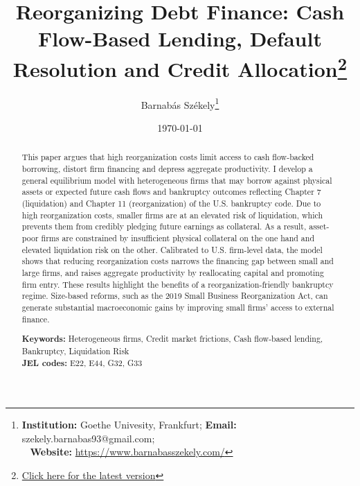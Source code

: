\documentclass[12pt]{article}
\title{\Large{\textbf{Reorganizing Debt Finance: Cash Flow-Based Lending, Default Resolution and Credit Allocation}}\thanks{ \href{https://github.com/barnithehun/Website/blob/gh/BSzekely_Draft.pdf}{Click here for the latest version} } }
\date{}
\begin{document}
\author{\small Barnabás Székely\thanks{\textbf{Institution:} Goethe Univesity, Frankfurt; \qquad \textbf{Email:} szekely.barnabas93@gmail.com;\\ \indent \  \hspace{0.8mm} \textbf{Website:} \url{https://www.barnabasszekely.com/}}}

\date{\small \today}

\maketitle

\vspace{-1cm}

\begin{abstract}
\noindent \vspace{-0.6cm}


This paper argues that high reorganization costs limit access to cash flow-backed borrowing, distort firm financing and depress aggregate productivity. I develop a general equilibrium model with heterogeneous firms that may borrow against physical assets or expected future cash flows and bankruptcy outcomes reflecting Chapter 7 (liquidation) and Chapter 11 (reorganization) of the U.S. bankruptcy code. Due to high reorganization costs, smaller firms are at an elevated risk of liquidation, which prevents them from credibly pledging future earnings as collateral. As a result, asset-poor firms are constrained by insufficient physical collateral on the one hand and elevated liquidation risk on the other. Calibrated to U.S. firm-level data, the model shows that reducing reorganization costs narrows the financing gap between small and large firms, and raises aggregate productivity by reallocating capital and promoting firm entry. These results highlight the benefits of a reorganization-friendly bankruptcy regime. Size-based reforms, such as the 2019 Small Business Reorganization Act, can generate substantial macroeconomic gains by improving small firms’ access to external finance.


\bigskip{}
\bigskip{}

\noindent \textbf{Keywords:} Heterogeneous firms, Credit market frictions, Cash flow-based lending, Bankruptcy, Liquidation Risk \\
\textbf{JEL codes:} E22, E44, G32, G33

\end{abstract}
\thispagestyle{empty}
\end{document}
